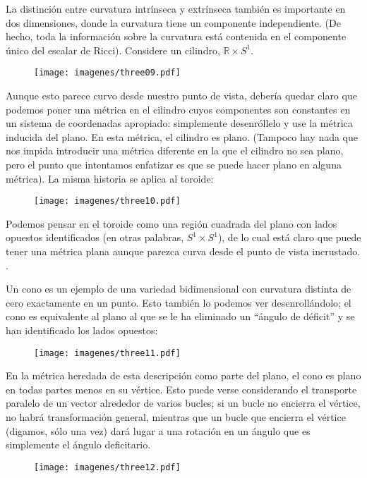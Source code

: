 \documentclass[11pt,b5paper,openany,twoside]{book}
\newcommand{\R}{\mathbb{R}}
\begin{document}
La distinción entre curvatura intrínseca y extrínseca también es importante en dos dimensiones, donde la curvatura tiene un componente independiente.
(De hecho, toda la información sobre la curvatura está contenida en el componente único del escalar de Ricci).
Considere un cilindro, $\R\times S^1$.
\begin{figure}[h]
\centering
\texttt{[image: imagenes/three09.pdf]}
\end{figure}
Aunque esto parece curvo desde nuestro punto de vista, debería quedar claro que podemos poner una métrica en el cilindro cuyos componentes son constantes en un sistema de coordenadas apropiado: simplemente desenróllelo y use la métrica inducida del plano.
En esta métrica, el cilindro es plano.
(Tampoco hay nada que nos impida introducir una métrica diferente en la que el cilindro no sea plano, pero el punto que intentamos enfatizar es que se puede hacer plano en alguna métrica).
La misma historia se aplica al toroide:

\begin{figure}[h]
\centering
\texttt{[image: imagenes/three10.pdf]}
\end{figure}

\noindent
Podemos pensar en el toroide como una región cuadrada del plano con lados opuestos identificados (en otras palabras, $S^1\times S^1$), de lo cual está claro que puede tener una métrica plana aunque parezca curva desde el punto de vista incrustado. .

Un cono es un ejemplo de una variedad bidimensional con curvatura distinta de cero exactamente en un punto.
Esto también lo podemos ver desenrollándolo; el cono es equivalente al plano al que se le ha eliminado un ``ángulo de déficit'' y se han identificado los lados opuestos:

\begin{figure}[h]
\centering
\texttt{[image: imagenes/three11.pdf]}
\end{figure}

\noindent
En la métrica heredada de esta descripción como parte del plano, el cono es plano en todas partes menos en su vértice.
Esto puede verse considerando el transporte paralelo de un vector alrededor de varios bucles; si un bucle no encierra el vértice, no habrá transformación general, mientras que un bucle que encierra el vértice (digamos, sólo una vez) dará lugar a una rotación en un ángulo que es simplemente el ángulo deficitario.

\begin{figure}[h]
\centering
\texttt{[image: imagenes/three12.pdf]}
\end{figure}
\end{document}
